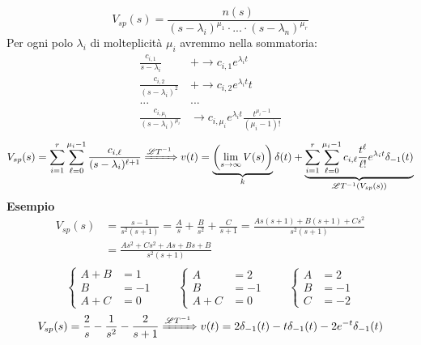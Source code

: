 \[V_{sp}(s) = \frac{n(s)}{(s - \lambda_i)^{\mu_1}\cdot...\cdot(s - \lambda_n)^{\mu_r}}\]
Per ogni polo $\lambda_i$ di molteplicità $\mu_i$ avremmo nella sommatoria:
\[
   \begin{split}
      \frac{c_{i,1}}{s - \lambda_i} & + \rightarrow c_{i,1}e^{\lambda_it}\\
      \frac{c_{i,2}}{(s - \lambda_i)^2} & + \rightarrow c_{i,2}e^{\lambda_it}t\\
      ... & ... \\
      \frac{c_{i,\mu_i}}{(s - \lambda_i)^{\mu_i}} & \rightarrow c_{i,\mu_i}e^{\lambda_it}\frac{t^{\mu_i-1}}{(\mu_i-1)!}
   \end{split}
\]
\[
   V_{sp}(s) = \sum_{i = 1}^r\sum_{\l = 0}^{\mu_i - 1}\frac{c_{i, \l}}{(s - \lambda_i)^{\l + 1}}\xRightarrow{\AL} v(t) = \underbrace{\BRP{\lim_{s\to\infty}V(s)}}_{k}\delta(t) + \underbrace{\sum_{i = 1}^r\sum_{\l = 0}^{\mu_i - 1}c_{i,\l}\frac{t^\l}{\l!}e^{\lambda_it}\gradino(t)}_{\AL(V_{sp}(s))}
\]
\textbf{Esempio}
\[
   \begin{split}
      V_{sp}(s) & = \frac{s - 1}{s^2(s + 1)} = \frac{A}{s} + \frac{B}{s^2} + \frac{C}{s + 1} = \frac{As(s + 1) + B(s + 1) + Cs^2}{s^2(s + 1)}\\
      & = \frac{As^2 + Cs^2 + As + Bs + B}{s^2(s + 1)}\\
   \end{split}
\]
\[
   \begin{cases}
      A + B & = 1 \\
      B     & = -1\\
      A + C & = 0
   \end{cases}
   \qquad
   \begin{cases}
      A     & = 2 \\
      B     & = -1\\
      A + C & = 0
   \end{cases}
   \qquad
   \begin{cases}
      A & = 2 \\
      B & = -1\\
      C & = -2
   \end{cases}
\]
\[
      V_{sp}(s) = \frac{2}{s} - \frac{1}{s^2} - \frac{2}{s + 1} \xRightarrow{\mathscr{L}T^{-1}} v(t) = 2\delta_{-1}(t) - t\delta_{-1}(t) - 2e^{-t}\delta_{-1}(t)
\]
%
